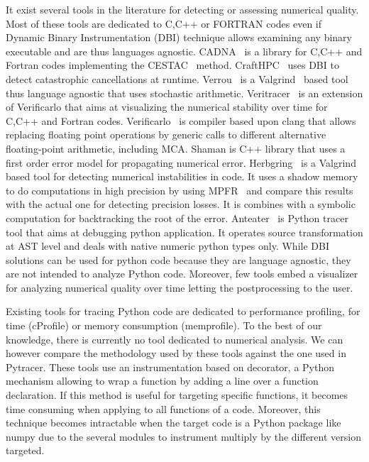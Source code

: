 \documentclass[acmconf,authordraft,anonymous,review]{acmart}
\begin{document}
It exist several tools in the literature for detecting or assessing numerical quality.
Most of these tools are dedicated to C,C++ or FORTRAN codes even if Dynamic Binary Instrumentation (DBI)
technique allows examining any binary executable and are thus languages agnostic.
CADNA~\cite{jezequel2008cadna} is a library for C,C++ and Fortran codes implementing
the CESTAC~\cite{vignes1993stochastic} method. 
CraftHPC~\cite{lam2013dynamic} uses DBI to detect catastrophic cancellations at runtime.
Verrou~\cite{fevotte2016verrou} is a Valgrind~\cite{nethercote2007valgrind} based tool 
thus language agnostic that uses stochastic arithmetic.
Veritracer~\cite{chatelain2018veritracer} is an extension of Verificarlo
that aims at visualizing the numerical stability over time for C,C++ and Fortran codes.
Verificarlo~\cite{denis2015verificarlo} is compiler based upon clang that 
allows replacing floating point operations by generic calls to 
different alternative floating-point arithmetic, including MCA.
Shaman \cite{demeure_phd} is C++ library that uses a first order error model for 
propagating numerical error. 
Herbgring~\cite{sanchez2017finding} is a Valgrind based tool for detecting 
numerical instabilities in code. It uses a shadow memory to do computations  
in high precision by using MPFR~\cite{fousse2007mpfr} and compare this results with the actual one
for detecting precision losses. It is combines with a symbolic computation for backtracking the root of the error.
Anteater~\cite{faust2019anteater} is Python tracer tool that aims at debugging python application. 
It operates source transformation at AST level and deals with native numeric python types only.
While DBI solutions can be used for python code because they are language agnostic, 
they are not intended to analyze Python code. Moreover, few tools embed a visualizer for 
analyzing numerical quality over time letting the postprocessing to the user. 

Existing tools for tracing Python code are dedicated to performance profiling, for time (cProfile) 
or memory consumption (memprofile). 
To the best of our knowledge, there is currently no tool dedicated to numerical analysis.
We can however compare the methodology used by these tools against the one used in Pytracer.
These tools use an instrumentation based on decorator, a Python mechanism allowing 
to wrap a function by adding a line over a function declaration.
If this method is useful for targeting specific functions, it becomes time consuming 
when applying to all functions of a code. Moreover, this technique becomes intractable
when the target code is a Python package like numpy due to the several modules to instrument
multiply by the different version targeted.
\end{document}
